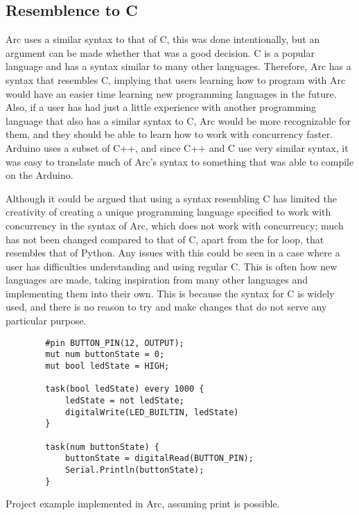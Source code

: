 \subsection{Resemblence to C}
Arc uses a similar syntax to that of C, this was done intentionally, but an argument can be made whether that was a good decision. C is a popular language and has a syntax similar to many other languages. Therefore, Arc has a syntax that resembles C, implying that users learning how to program with Arc would have an easier time learning new programming languages in the future. Also, if a user has had just a little experience with another programming language that also has a similar syntax to C, Arc would be more recognizable for them, and they should be able to learn how to work with concurrency faster. Arduino uses a subset of C++, and since C++ and C use very similar syntax, it was easy to translate much of Arc's syntax to something that was able to compile on the Arduino.

Although it could be argued that using a syntax resembling C has limited the creativity of creating a unique programming language specified to work with concurrency in the syntax of Arc, which does not work with concurrency; much has not been changed compared to that of C, apart from the for loop, that resembles that of Python. Any issues with this could be seen in a case where a user has difficulties understanding and using regular C. This is often how new languages are made, taking inspiration from many other languages and implementing them into their own. This is because the syntax for C is widely used, and there is no reason to try and make changes that do not serve any particular purpose. 


\begin{listing}[htb!]
    \begin{verbatim}
        #pin BUTTON_PIN(12, OUTPUT);
        mut num buttonState = 0;
        mut bool ledState = HIGH;

        task(bool ledState) every 1000 {
            ledState = not ledState;
            digitalWrite(LED_BUILTIN, ledState)
        }

        task(num buttonState) {
            buttonState = digitalRead(BUTTON_PIN);
            Serial.Println(buttonState);
        }
    \end{verbatim}
    \caption{Project example implemented in Arc, assuming print is possible.}
    \label{lst:arcexample}
\end{listing}